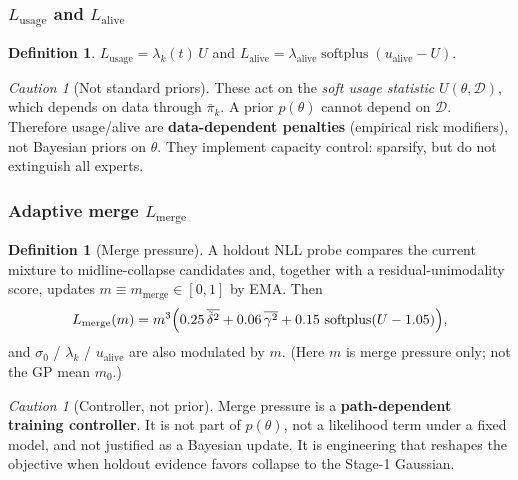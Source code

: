 \documentclass[11pt,a4paper]{article}
\theoremstyle{plain}
\theoremstyle{definition}
\newtheorem{definition}[theorem]{Definition}
\theoremstyle{remark}
\newtheorem{caution}[theorem]{Caution}
\newcommand{\D}{\mathcal{D}}
\newcommand{\tht}{\theta}
\newcommand{\softplus}{\operatorname{softplus}}
\begin{document}
\subsubsection{\texorpdfstring{$L_{\mathrm{usage}}$}{L\_usage} and \texorpdfstring{$L_{\mathrm{alive}}$}{L\_alive}}
\begin{definition}
\(L_{\mathrm{usage}}=\lambda_k(t)\,U\) and
\(L_{\mathrm{alive}}=\lambda_{\mathrm{alive}}\softplus(u_{\mathrm{alive}}-U)\).
\end{definition}

\begin{caution}[Not standard priors]
These act on the \emph{soft usage statistic} \(U(\tht,\D)\), which depends on data through
\(\bar\pi_k\). A prior \(p(\tht)\) cannot depend on \(\D\). Therefore usage/alive are
\textbf{data-dependent penalties} (empirical risk modifiers), not Bayesian priors on
\(\tht\).
They implement capacity control: sparsify, but do not extinguish all experts.
\end{caution}

\subsubsection{Adaptive merge \texorpdfstring{$L_{\mathrm{merge}}$}{L\_merge}}
\label{sec:merge}
\begin{definition}[Merge pressure]
A holdout NLL probe compares the current mixture to midline-collapse candidates and,
together with a residual-unimodality score, updates
\(m\equiv m_{\mathrm{merge}}\in[0,1]\) by EMA.
Then
\begin{equation}
  L_{\mathrm{merge}}(m)
  =
  m^3
  \Bigl(
    0.25\,\overline{\tilde\delta^{2}}
    +
    0.06\,\overline{\gamma^{2}}
    +
    0.15\,\softplus(U-1.05)
  \Bigr),
\end{equation}
and \(\sigma_0\) / \(\lambda_k\) / \(u_{\mathrm{alive}}\) are also modulated by \(m\).
(Here \(m\) is merge pressure only; not the GP mean \(m_0\).)
\end{definition}

\begin{caution}[Controller, not prior]
Merge pressure is a \textbf{path-dependent training controller}.
It is not part of \(p(\tht)\), not a likelihood term under a fixed model, and not
justified as a Bayesian update. It is engineering that reshapes the objective when
holdout evidence favors collapse to the Stage-1 Gaussian.
\end{caution}
\end{document}
